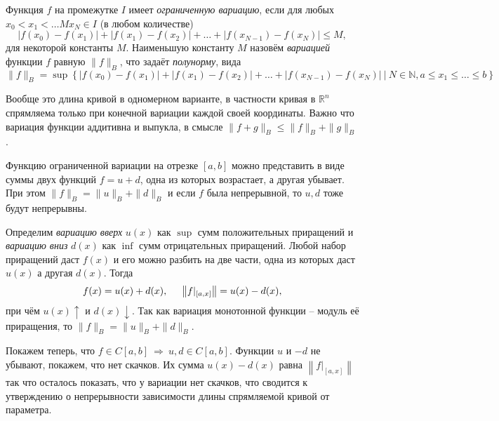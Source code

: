 
\begin{to_def}
    Функция $f$ на промежутке $I$ имеет \textit{ограниченную вариацию}, если для любых $x_0 < x_1 < \ldots M x_N \in I$ (в любом количестве)
    \begin{equation*}
        |f(x_0) - f(x_1)| + 
        |f(x_1) - f(x_2)| + \ldots +
        |f(x_{N-1}) - f(x_N)| \leq M,
    \end{equation*}
    для некоторой константы $M$. Наименьшую константу $M$  назовём \textit{вариацией} функции $f$ равную $\|f\|_B$, что задаёт \textit{полунорму}, вида
    \begin{equation*}
        \|f\|_B = \sup\left\{
                            |f(x_0) - f(x_1)| + 
                        |f(x_1) - f(x_2)| + \ldots +
                        |f(x_{N-1}) - f(x_N)| \ 
                        \bigg| \ 
                        N \in \mathbb{N}, a \leq x_1 \leq \ldots \leq b\right\}
    \end{equation*}
\end{to_def}

Вообще это длина кривой в одномерном варианте, в частности кривая в $\mathbb{R}^n$ спрямляема только при конечной вариации каждой своей координаты. Важно что вариация функции аддитивна и выпукла, в смысле $\|f + g\|_B \leq \|f\|_B + \|g\|_B$.

\begin{to_lem}
    Функцию ограниченной вариации на отрезке $[a, b]$ можно представить в виде суммы двух функций $f = u + d$, одна из которых возрастает, а другая убывает. При этом $\|f\|_B = \|u\|_B + \|d\|_B$ и если $f$ была непрерывной, то $u, d$ тоже будут непрерывны.
\end{to_lem}


\begin{uproof}
    Определим \textit{вариацию вверх} $u(x)$ как $\sup$ сумм положительных приращений и \textit{вариацию вниз} $d(x)$ как $\inf$ сумм отрицательных приращений. Любой набор приращений даст $f(x)$ и его можно разбить на две части, одна из которых даст $u(x)$ а другая $d(x)$. Тогда
    \begin{equation*}
        f(x) = u(x) + d(x), \hspace{5 mm} 
        \left\| f|_{[a, x]} \right\| = u(x) - d(x),
    \end{equation*}
    при чём $u(x) \uparrow$ и $d(x) \downarrow$. Так как вариация монотонной функции -- модуль её приращения, то $\|f\|_B = \|u\|_B + \|d\|_B$. 

    Покажем теперь, что $f \in C[a, b] \ \Rightarrow \ u, d \in C[a,b]$. Функции $u$ и $-d$ не убывают, покажем, что нет скачков. Их сумма $u(x) - d(x)$ равна $\left\| f|_{[a, x]} \right\|$ так что осталось показать, что у вариации нет скачков, что сводится к утверждению о непрерывности зависимости длины спрямляемой кривой от параметра. 
\end{uproof}


